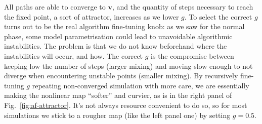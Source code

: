 All paths are able to converge to $\mathbf{v}$, and the quantity of steps necessary to reach the fixed point, a sort of attractor, increases as we lower $g$. To select the correct $g$ turns out to be the real algorithm fine-tuning knob: as we saw for the normal phase, some model parametrisation could lead to unavoidable algorithmic instabilities. The problem is that we do not know beforehand where the instabilities will occur, and how. The correct $g$ is the compromise between keeping low the number of steps (larger mixing) and moving slow enough to not diverge when encountering unstable points (smaller mixing). By recursively fine-tuning $g$ repeating non-converged simulation with more care, we are essentially making the nonlinear map ``softer'' and curvier, as is in the right panel of Fig.~\ref{fig:af-attractor}. It's not always resource convenient to do so, so for most simulations we stick to a rougher map (like the left panel one) by setting $g=0.5$.
